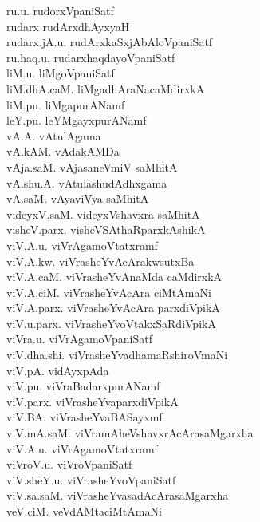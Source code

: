 {\begin{multicols}{2}
\begin{tabbing}
ru.u. \> rudorxVpaniSatf\\[2pt]
rudarx \> rudArxdhAyxyaH\\[2pt]
rudarx.jA.u. \> rudArxkaSxjAbAloVpaniSatf\\[2pt]
ru.haq.u. \> rudarxhaqdayoVpaniSatf\\[2pt]
liM.u. \> liMgoVpaniSatf\\[2pt]
liM.dhA.caM. \> liMgadhAraNacaMdirxkA\\[2pt]
liM.pu. \> liMgapurANamf\\[2pt]
leY.pu. \> leYMgayxpurANamf\\[2pt]
vA.A. \> vAtulAgama\\[2pt]
vA.kAM. \> vAdakAMDa\\[2pt]
vAja.saM. \> vAjasaneVmiV saMhitA\\[2pt]
vA.shu.A. \> vAtulashudAdhxgama\\[2pt]
vA.saM. \> vAyaviVya saMhitA\\[2pt]
videyxV.saM. \> videyxVshavxra saMhitA\\[2pt]
visheV.parx. \> visheVSAthaRparxkAshikA\\[2pt]
viV.A.u. \> viVrAgamoVtatxramf\\[2pt]
viV.A.kw. \> viVrasheYvAcArakwsutxBa\\[2pt]
viV.A.caM. \> viVrasheYvAnaMda caMdirxkA\\[2pt]
viV.A.ciM. \> viVrasheYvAcAra ciMtAmaNi\\[2pt]
viV.A.parx. \> viVrasheYvAcAra parxdiVpikA\\[2pt]
viV.u.parx. \> viVrasheYvoVtakxSaRdiVpikA\\[2pt]
viVra.u. \> viVrAgamoVpaniSatf\\[2pt]
viV.dha.shi. \> viVrasheYvadhamaRshiroVmaNi\\[2pt]
viV.pA. \> vidAyxpAda\\[2pt]
viV.pu. \> viVraBadarxpurANamf\\[2pt]
viV.parx. \> viVrasheYvaparxdiVpikA\\[2pt]
viV.BA. \> viVrasheYvaBASayxmf\\[2pt]
viV.mA.saM. \> viVramAheVshavxrAcArasaMgarxha\\[2pt]
viV.A.u. \> viVrAgamoVtatxramf\\[2pt]
viVroV.u. \> viVroVpaniSatf\\[2pt]
viV.sheY.u. \> viVrasheYvoVpaniSatf\\[2pt]
viV.sa.saM. \> viVrasheYvasadAcArasaMgarxha\\[2pt]
veV.ciM. \> veVdAMtaciMtAmaNi\\[2pt]

\end{tabbing}
\end{multicols}}
